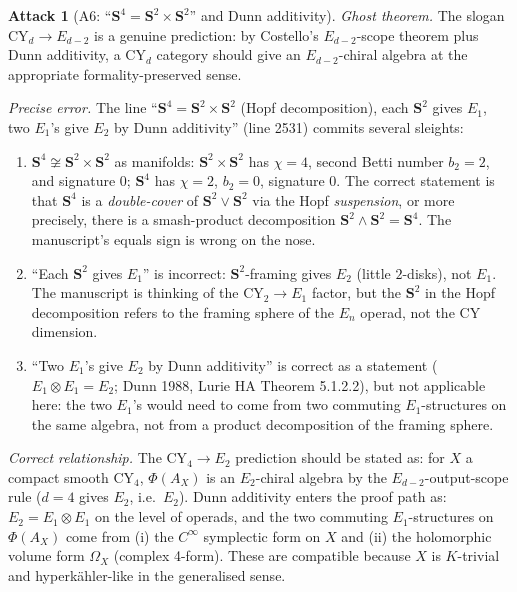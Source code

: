 \documentclass[11pt]{amsart}
\theoremstyle{definition}
\newtheorem{attack}{Attack}
\providecommand{\CY}{\mathrm{CY}}
\providecommand{\Eone}{E_1}
\providecommand{\Etwo}{E_2}
\providecommand{\bS}{\mathbf{S}}
\begin{document}
\begin{attack}[A6: ``$\bS^4 = \bS^2 \times \bS^2$'' and Dunn additivity]\leavevmode

\noindent\emph{Ghost theorem.} The slogan $\CY_d \to E_{d-2}$ is a
genuine prediction: by Costello's $E_{d-2}$-scope theorem plus Dunn
additivity, a CY$_d$ category should give an $E_{d-2}$-chiral algebra
at the appropriate formality-preserved sense.

\noindent\emph{Precise error.} The line ``$\bS^4 = \bS^2 \times \bS^2$
(Hopf decomposition), each $\bS^2$ gives $\Eone$, two $\Eone$'s give
$\Etwo$ by Dunn additivity'' (line 2531) commits several sleights:

\begin{enumerate}[label=(\alph*)]
 \item $\bS^4 \not\cong \bS^2 \times \bS^2$ as manifolds:
   $\bS^2 \times \bS^2$ has $\chi = 4$, second Betti number $b_2 = 2$,
   and signature $0$; $\bS^4$ has $\chi = 2$, $b_2 = 0$, signature $0$.
   The correct statement is that $\bS^4$ is a {\em double-cover} of
   $\bS^2 \vee \bS^2$ via the Hopf \emph{suspension}, or more
   precisely, there is a smash-product decomposition
   $\bS^2 \wedge \bS^2 = \bS^4$. The manuscript's equals sign is
   wrong on the nose.
 \item ``Each $\bS^2$ gives $\Eone$'' is incorrect: $\bS^2$-framing
   gives $\Etwo$ (little $2$-disks), not $\Eone$.  The manuscript is
   thinking of the CY$_2 \to \Eone$ factor, but the $\bS^2$ in the
   Hopf decomposition refers to the framing sphere of the $E_n$ operad,
   not the CY dimension.
 \item ``Two $\Eone$'s give $\Etwo$ by Dunn additivity'' is correct as
   a statement ($\Eone \otimes \Eone = \Etwo$; Dunn 1988, Lurie HA
   Theorem 5.1.2.2), but not applicable here: the two $\Eone$'s
   would need to come from two commuting $\Eone$-structures on the
   same algebra, not from a product decomposition of the framing sphere.
\end{enumerate}

\noindent\emph{Correct relationship.} The CY$_4 \to \Etwo$ prediction
should be stated as: for $X$ a compact smooth CY$_4$, $\Phi(A_X)$ is an
$\Etwo$-chiral algebra by the $E_{d-2}$-output-scope rule ($d = 4$
gives $E_2$, i.e.\ $\Etwo$). Dunn additivity enters the proof path
as: $\Etwo = \Eone \otimes \Eone$ on the level of operads, and the two
commuting $\Eone$-structures on $\Phi(A_X)$ come from (i) the
$C^\infty$ symplectic form on $X$ and (ii) the holomorphic volume form
$\Omega_X$ (complex 4-form). These are compatible because $X$ is
$K$-trivial and hyperkähler-like in the generalised sense.
\end{attack}
\end{document}
